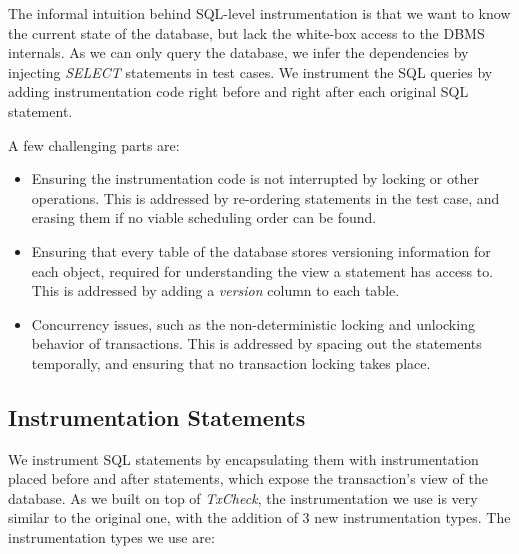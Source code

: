 The informal intuition behind SQL-level instrumentation is that we want to know the current state of the database, but lack the white-box access to the DBMS internals. As we can only query the database, we infer the dependencies by injecting \textit{SELECT} statements in test cases. We instrument the SQL queries by adding instrumentation code right before and right after each original SQL statement.

A few challenging parts are:

\begin{itemize}
    \item Ensuring the instrumentation code is not interrupted by locking or other operations. This is addressed by re-ordering statements in the test case, and erasing them if no viable scheduling order can be found.
    \item Ensuring that every table of the database stores versioning information for each object, required for understanding the view a statement has access to. This is addressed by adding a \textit{version} column to each table.
    \item Concurrency issues, such as the non-deterministic locking and unlocking behavior of transactions. This is addressed by spacing out the statements temporally, and ensuring that no transaction locking takes place.
\end{itemize}


\subsection{Instrumentation Statements}

We instrument SQL statements by encapsulating them with instrumentation placed before and after statements, which expose the transaction's view of the database. As we built on top of \textit{TxCheck}, the instrumentation we use is very similar to the original one, with the addition of $3$ new instrumentation types. The instrumentation types we use are:

